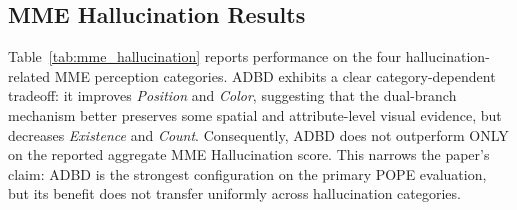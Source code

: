 \begin{table}[t]
\centering
\small
\setlength{\tabcolsep}{4pt}
\caption{Detailed POPE results for the primary baselines and ADBD, including the ratio of ``Yes'' responses to expose response-bias shifts. \todo: insert values.}
\label{tab:detailed_results}
\end{table}

\subsection{MME Hallucination Results}

Table~\ref{tab:mme_hallucination} reports performance on the four hallucination-related MME perception categories. ADBD exhibits a clear category-dependent tradeoff: it improves \emph{Position} and \emph{Color}, suggesting that the dual-branch mechanism better preserves some spatial and attribute-level visual evidence, but decreases \emph{Existence} and \emph{Count}. Consequently, ADBD does not outperform ONLY on the reported aggregate MME Hallucination score. This narrows the paper's claim: ADBD is the strongest configuration on the primary POPE evaluation, but its benefit does not transfer uniformly across hallucination categories.

